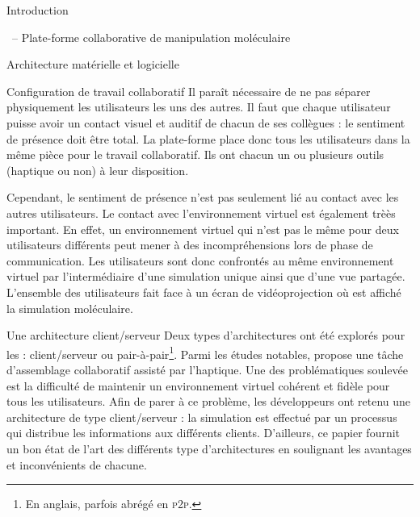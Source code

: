 \documentclass[myfrancais]{mythesis}
\begin{document}
\begin{mypart}{Introduction}
\begin{mychapter}{\myShaddock\ -- Plate-forme collaborative de manipulation moléculaire}
\begin{mysection}{Architecture matérielle et logicielle}
\begin{mysubsection}{Configuration de travail collaboratif}
					Il paraît nécessaire de ne pas séparer physiquement les utilisateurs les uns des autres.
					Il faut que chaque utilisateur puisse avoir un contact visuel et auditif de chacun de ses collègues : le sentiment de présence doit être total.
					La plate-forme \myShaddock place donc tous les utilisateurs dans la même pièce pour le travail collaboratif.
					Ils ont chacun un ou plusieurs outils (haptique ou non) à leur disposition.

					Cependant, le sentiment de présence n'est pas seulement lié au contact avec les autres utilisateurs.
					Le contact avec l'environnement virtuel est également trèès important.
					En effet, un environnement virtuel qui n'est pas le même pour deux utilisateurs différents peut mener à des incompréhensions lors de phase de communication.
					Les utilisateurs sont donc confrontés au même environnement virtuel par l'intermédiaire d'une simulation unique ainsi que d'une vue partagée.
					L'ensemble des utilisateurs fait face à un écran de vidéoprojection où est affiché la simulation moléculaire.
				\end{mysubsection}
				\begin{mysubsection}{Une architecture client/serveur}
					Deux types d'architectures ont été explorés pour les  : client/serveur ou pair-à-pair\footnote{En anglais,  parfois abrégé en \textsc{p2p}.}.
					Parmi les études notables,  propose une tâche d'assemblage collaboratif assisté par l'haptique.
					Une des problématiques soulevée est la difficulté de maintenir un environnement virtuel cohérent et fidèle pour tous les utilisateurs.
					Afin de parer à ce problème, les développeurs ont retenu une architecture de type client/serveur : la simulation est effectué par un processus qui distribue les informations aux différents clients.
					D'ailleurs, ce papier fournit un bon état de l'art des différents type d'architectures en soulignant les avantages et inconvénients de chacune.


\end{mysubsection}
\end{mysection}
\end{mychapter}
\end{mypart}
\end{document}
